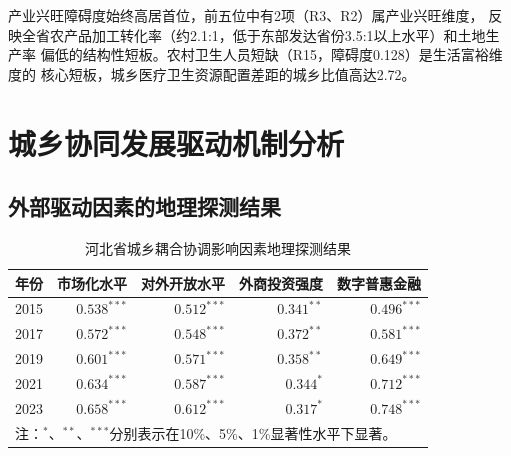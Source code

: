 \documentclass[12pt, a4paper, twoside]{ctexart}
\begin{document}
产业兴旺障碍度始终高居首位，前五位中有2项（R3、R2）属产业兴旺维度，
反映全省农产品加工转化率（约2.1:1，低于东部发达省份3.5:1以上水平）和土地生产率
偏低的结构性短板。农村卫生人员短缺（R15，障碍度0.128）是生活富裕维度的
核心短板，城乡医疗卫生资源配置差距的城乡比值高达2.72。

\section{城乡协同发展驱动机制分析}

\subsection{外部驱动因素的地理探测结果}

\begin{table}[H]
  \centering
  \caption{河北省城乡耦合协调影响因素地理探测结果}
  \label{tab:geodetect}
  \begin{tabularx}{\linewidth}{c
      r r
      r r}
    \toprule
    \rowcolor{TableHead}
    \color{white}\bfseries 年份 &
    \color{white}\bfseries 市场化水平 &
    \color{white}\bfseries 对外开放水平 &
    \color{white}\bfseries 外商投资强度 &
    \color{white}\bfseries 数字普惠金融 \\
    \midrule
    2015 & $0.538^{***}$ & $0.512^{***}$ & $0.341^{**}$  & $0.496^{***}$ \\
    \rowcolor{TableRow}
    2017 & $0.572^{***}$ & $0.548^{***}$ & $0.372^{**}$  & $0.581^{***}$ \\
    2019 & $0.601^{***}$ & $0.571^{***}$ & $0.358^{**}$  & $0.649^{***}$ \\
    \rowcolor{TableRow}
    2021 & $0.634^{***}$ & $0.587^{***}$ & $0.344^{*}$   & $0.712^{***}$ \\
    2023 & $0.658^{***}$ & $0.612^{***}$ & $0.317^{*}$   & $0.748^{***}$ \\
    \bottomrule
    \multicolumn{5}{l}{\footnotesize
      注：$^*$、$^{**}$、$^{***}$分别表示在10\%、5\%、1\%显著性水平下显著。}
  \end{tabularx}
\end{table}
\end{document}
